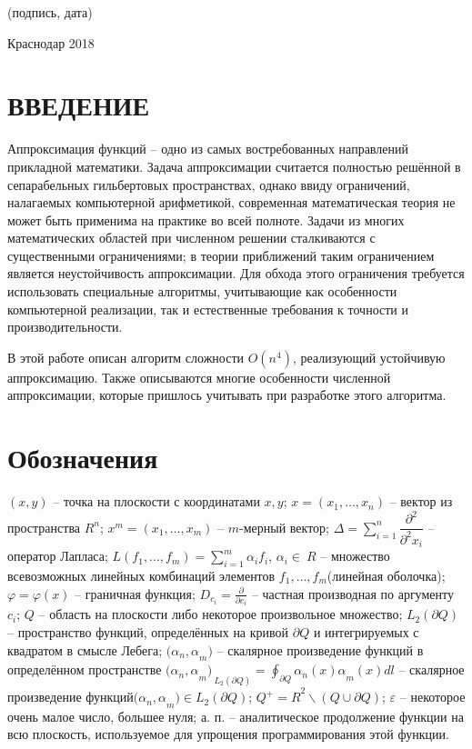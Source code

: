 ﻿\documentclass[a4paper, 12pt]{article}
\begin{document}
\noindent (подпись, дата)

\noindent 

\noindent 

\noindent 

\noindent 

\noindent Краснодар 2018

\section{ВВЕДЕНИЕ}

Аппроксимация функций -- одно из самых востребованных направлений прикладной математики. Задача аппроксимации считается полностью решённой в сепарабельных гильбертовых пространствах, однако ввиду ограничений, налагаемых компьютерной арифметикой, современная математическая теория не может быть применима на практике во всей полноте. Задачи из многих математических областей при численном решении сталкиваются с существенными ограничениями; в теории приближений таким ограничением является неустойчивость аппроксимации. Для обхода этого ограничения требуется использовать специальные алгоритмы, учитывающие как особенности компьютерной реализации, так и естественные требования к точности и производительности.

В этой работе описан алгоритм сложности $O(n^4)$, реализующий устойчивую аппроксимацию. Также описываются многие особенности численной аппроксимации, которые пришлось учитывать при разработке этого алгоритма.

\section{Обозначения}

$\left(x,y\right)$ -- точка на плоскости с координатами $x,y$;
$x=\left(x_1,\dots ,x_n\right)$ -- вектор из пространства $R^n$;
$x^m=\left(x_1,\dots ,x_m\right)$ -- $m$-мерный вектор;
$\Delta =\sum^n_{i=1}{\dfrac{{\partial }^2}{{{\partial }^2x}_i}}$ -- оператор Лапласа;
$L\left(f_1,\dots ,f_m\right)=\sum^m_{i=1}{{\alpha }_if_i}$, ${\alpha }_i\in \ R$ -- множество всевозможных линейных комбинаций элементов $f_1,\dots ,f_m$(линейная оболочка);
$\varphi =\varphi \left(x\right)$ -- граничная функция;
$D_{c_i}=\frac{\partial }{{\partial c}_i}$ -- частная производная по аргументу $c_i$;
$Q$ -- область на плоскости либо некоторое произвольное множество;
${L}_2\left(\partial Q\right)$ -- пространство функций, определённых на кривой $\partial Q$ и интегрируемых с квадратом в смысле Лебега;
${({\alpha }_n,\alpha }_m)$ -- скалярное произведение функций в определённом пространстве ${{({\alpha }_n,\alpha }_m)}_{{\ L}_2\left(\partial Q\right)}=\oint_{\partial Q}{{{\alpha }_n\left(x\right)\alpha }_m\left(x\right)dl}$ -- скалярное произведение функций${({\alpha }_n,\alpha }_m)\in {L}_2\left(\partial Q\right)$;
${Q^+=R}^2\backslash (Q\cup \partial Q)$;
$\varepsilon$ -- некоторое очень малое число, большее нуля;
а. п. -- аналитическое продолжение функции на всю плоскость, используемое для упрощения программирования этой функции.
\end{document}
